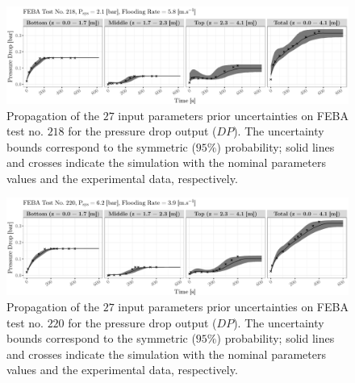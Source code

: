 \begin{figure}[bth]
    \centering
    \includegraphics[width=1.0\textwidth]{../figures/chapter2/figures/plotTraceUQPriorDP218}
    \caption[Propagation of the $27$ input parameters prior uncertainties on FEBA test no. $218$ for the pressure drop output ($DP$).]{Propagation of the $27$ input parameters prior uncertainties on FEBA test no. $218$ for the pressure drop output ($DP$). The uncertainty bounds correspond to the symmetric ($95\%$) probability; solid lines and crosses indicate the simulation with the nominal parameters values and the experimental data, respectively.}
    \label{fig:ch2_plot_trace_uq_prior_dp_218}
\end{figure}

\begin{figure}[bth]
    \centering
    \includegraphics[width=1.0\textwidth]{../figures/chapter2/figures/plotTraceUQPriorDP220}
    \caption[Propagation of the $27$ input parameters prior uncertainties on FEBA test no. $220$ for the pressure drop output ($DP$).]{Propagation of the $27$ input parameters prior uncertainties on FEBA test no. $220$ for the pressure drop output ($DP$). The uncertainty bounds correspond to the symmetric ($95\%$) probability; solid lines and crosses indicate the simulation with the nominal parameters values and the experimental data, respectively.}
    \label{fig:ch2_plot_trace_uq_prior_dp_220}
\end{figure}

